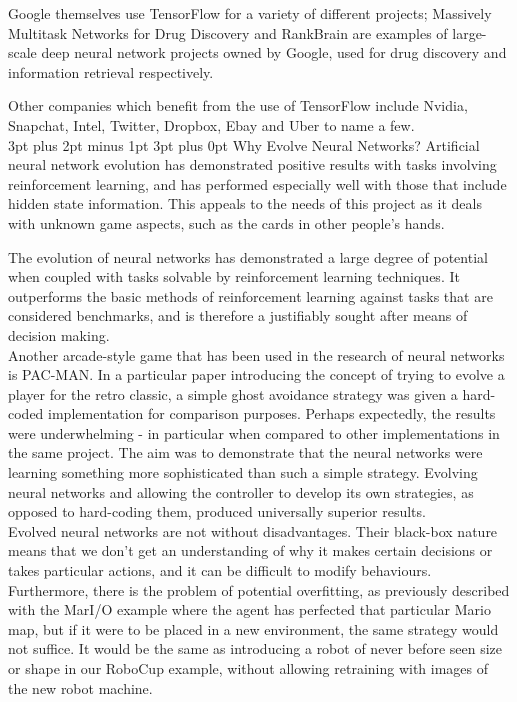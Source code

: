 \documentclass[12pt,a4paper]{article}
\makeatletter
\renewcommand\subsection{\@startsection {subsection}{1}{2mm} %
                               {3pt plus 2pt minus 1pt} %
                               {3pt plus 0pt} %
                               {\normalfont\bfseries}}
\makeatother
\begin{document}
Google themselves use TensorFlow for a variety of different projects;  Massively Multitask Networks for Drug Discovery and RankBrain are examples of large-scale deep neural network projects owned by Google, used for drug discovery and information retrieval respectively\citep{17}. 

Other companies which benefit from the use of TensorFlow include Nvidia, Snapchat, Intel, Twitter, Dropbox, Ebay and Uber to name a few. \\


\subsection{Why Evolve Neural Networks?}
Artificial neural network evolution has demonstrated positive results with tasks involving reinforcement learning, and has performed especially well with those that include hidden state information\citep{EfficientEvolutionOfNeuralNetworkTopologies}. This appeals to the needs of this project as it deals with unknown game aspects, such as the cards in other people's hands. 

The evolution of neural networks has demonstrated a large degree of potential when coupled with tasks solvable by reinforcement learning techniques\citep{EfficientEvolutionOfNeuralNetworkTopologies}. It outperforms the basic methods of reinforcement learning against tasks that are considered benchmarks, and is therefore a justifiably sought after means of decision making.\\

Another arcade-style game that has been used in the research of neural networks is PAC-MAN. In a particular paper introducing the concept of trying to evolve a player for the retro classic, a simple ghost avoidance strategy was given a hard-coded implementation for comparison purposes. Perhaps expectedly, the results were underwhelming - in particular when compared to other implementations in the same project. The aim was to demonstrate that the neural networks were learning something more sophisticated than such a simple strategy\citep{MSPacMan}. Evolving neural networks and allowing the controller to develop its own strategies, as opposed to hard-coding them, produced universally superior results.\\

Evolved neural networks are not without disadvantages. Their black-box nature means that we don't get an understanding of why it makes certain decisions or takes particular actions, and it can be difficult to modify behaviours. Furthermore, there is the problem of potential overfitting, as previously described with the MarI/O\citep{MarIO} example where the agent has perfected that particular Mario map, but if it were to be placed in a new environment, the same strategy would not suffice. It would be the same as introducing a robot of never before seen size or shape in our RoboCup\citep{24} example, without allowing retraining with images of the new robot machine.\\
\end{document}
